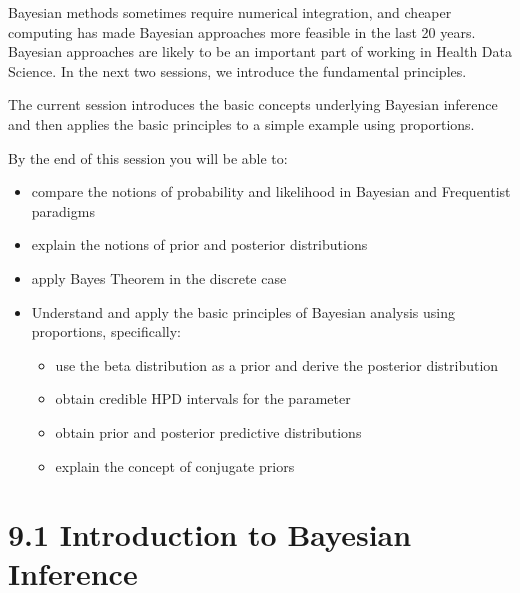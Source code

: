 \documentclass[letterpaper,10pt,english]{jupyterBook}
\begin{document}
\sphinxAtStartPar
Bayesian methods sometimes require numerical integration, and cheaper computing has made Bayesian approaches more feasible in the last 20 years. Bayesian approaches are likely to be an important part of working in Health Data Science. In the next two sessions, we introduce the fundamental principles.

\sphinxAtStartPar
The current session introduces the basic concepts underlying Bayesian inference and then applies the basic principles to a simple example using proportions.



\sphinxAtStartPar
By the end of this session you will be able to:
\begin{itemize}
\item {} 
\sphinxAtStartPar
compare the notions of probability and likelihood in Bayesian and Frequentist paradigms

\item {} 
\sphinxAtStartPar
explain the notions of prior and posterior distributions

\item {} 
\sphinxAtStartPar
apply Bayes Theorem in the discrete case

\item {} 
\sphinxAtStartPar
Understand and apply the basic principles of Bayesian analysis using proportions, specifically:
\begin{itemize}
\item {} 
\sphinxAtStartPar
use the beta distribution as a prior and derive the posterior distribution

\item {} 
\sphinxAtStartPar
obtain credible HPD intervals for the parameter

\item {} 
\sphinxAtStartPar
obtain prior and posterior predictive distributions

\item {} 
\sphinxAtStartPar
explain the concept of conjugate priors

\end{itemize}

\end{itemize}




\section{9.1 Introduction to Bayesian Inference}
\label{\detokenize{09.b. Bayesian Statistics I:introduction-to-bayesian-inference}}\label{\detokenize{09.b. Bayesian Statistics I::doc}}
\end{document}
